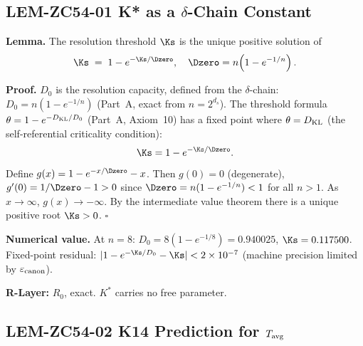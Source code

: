 \documentclass[12pt, a4paper]{article}
\begin{document}
\subsection{LEM-ZC54-01 \quad K* as a $\delta$-Chain Constant}
\label{zc54:sec:lem01}


\begin{formalbox}[title={LEM-ZC54-01: $K^*$ is the Unique
  Positive Fixed Point of the $\theta$-Formula ($R_0$, Exact)}]
\textbf{Lemma.}
The resolution threshold $\Ks$ is the unique positive solution of
\begin{equation}\label{zc54:eq:kstar-fp}
  \Ks \;=\; 1 - e^{-\Ks/\Dzero},
  \quad \Dzero = n\!\left(1 - e^{-1/n}\right).
\end{equation}

\textbf{Proof.}
$D_0$ is the resolution capacity, defined from the $\delta$-chain:
$D_0 = n(1-e^{-1/n})$ (Part~A, exact from $n = 2^{d_s}$).
The threshold formula $\theta = 1 - e^{-D_{\rm KL}/D_0}$ (Part~A,
Axiom~10) has a fixed point where $\theta = D_{\rm KL}$ (the
self-referential criticality condition):
\[
  \Ks = 1 - e^{-\Ks/\Dzero}.
\]
Define $g(x) = 1 - e^{-x/\Dzero} - x$. Then $g(0) = 0$
(degenerate), $g'(0) = 1/\Dzero - 1 > 0$ since
$\Dzero = n(1-e^{-1/n}) < 1$ for all $n > 1$.
As $x\to\infty$, $g(x) \to -\infty$.
By the intermediate value theorem there is a unique positive
root $\Ks > 0$. \hfill$\square$

\textbf{Numerical value.}
At $n = 8$: $D_0 = 8(1-e^{-1/8}) = 0.940025$, $\Ks = 0.117500$.
Fixed-point residual: $|1 - e^{-\Ks/D_0} - \Ks| < 2\times 10^{-7}$
(machine precision limited by $\varepsilon_{\rm canon}$).

\textbf{R-Layer:} $R_0$, exact. $K^*$ carries no free parameter.
\end{formalbox}

\subsection{LEM-ZC54-02 \quad K14 Prediction for $T_{\rm avg}$}
\label{zc54:sec:lem02}

\end{document}

